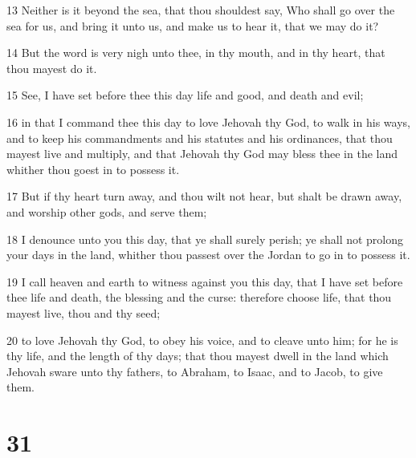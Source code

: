 \par 13 Neither is it beyond the sea, that thou shouldest say, Who shall go over the sea for us, and bring it unto us, and make us to hear it, that we may do it?
\par 14 But the word is very nigh unto thee, in thy mouth, and in thy heart, that thou mayest do it.
\par 15 See, I have set before thee this day life and good, and death and evil;
\par 16 in that I command thee this day to love Jehovah thy God, to walk in his ways, and to keep his commandments and his statutes and his ordinances, that thou mayest live and multiply, and that Jehovah thy God may bless thee in the land whither thou goest in to possess it.
\par 17 But if thy heart turn away, and thou wilt not hear, but shalt be drawn away, and worship other gods, and serve them;
\par 18 I denounce unto you this day, that ye shall surely perish; ye shall not prolong your days in the land, whither thou passest over the Jordan to go in to possess it.
\par 19 I call heaven and earth to witness against you this day, that I have set before thee life and death, the blessing and the curse: therefore choose life, that thou mayest live, thou and thy seed;
\par 20 to love Jehovah thy God, to obey his voice, and to cleave unto him; for he is thy life, and the length of thy days; that thou mayest dwell in the land which Jehovah sware unto thy fathers, to Abraham, to Isaac, and to Jacob, to give them.

\chapter{31}

